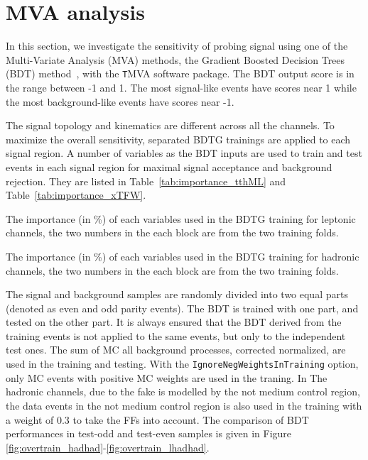 \section{MVA analysis}
\label{sec:mva}

In this section, we investigate the sensitivity of probing signal using one of the Multi-Variate Analysis (MVA) methods, the Gradient Boosted Decision Trees (BDT) method~\cite{BDT,BDT2}, with the {\texttt TMVA} software package. The BDT output score is in the range between -1 and 1. The most signal-like events have scores near 1 while the most background-like events have scores near -1.

The signal topology and kinematics are different across all the channels. To maximize the overall sensitivity, separated BDTG trainings are applied to each signal region. A number of variables as the BDT inputs are used to train and test events in each signal region for maximal signal acceptance and background rejection. They are listed in Table~\ref{tab:importance_tthML} and Table~\ref{tab:importance_xTFW}. 

\begin{table}
\caption{The importance (in \%) of each variables used in the BDTG training for leptonic channels, the two numbers in the each block are from the two training folds.}
\label{tab:importance_tthML}
\begin{adjustbox}{center}

\end{adjustbox}
\end{table}


\begin{table}
\caption{The importance (in \%) of each variables used in the BDTG training for hadronic channels, the two numbers in the each block are from the two training folds.}
\label{tab:importance_xTFW}

\end{table}

The signal and background samples are randomly divided into two equal parts (denoted as even and odd parity events). The BDT is trained with one part, and tested on the other part. It is always ensured that the BDT derived from the training events is not applied to the same events, but only to the independent test ones. The sum of MC all background processes, corrected normalized, are used in the training and testing. %
With the \texttt{IgnoreNegWeightsInTraining} option, only MC events with positive MC weights are used in the traning. In The hadronic channels, due to the fake is modelled by the not medium control region, the data events in the not medium control region is also used in the training with a weight of 0.3 to take the FFs into account. The comparison of BDT performances in test-odd and test-even samples is given in Figure \ref{fig:overtrain_hadhad}-\ref{fig:overtrain_lhadhad}.

